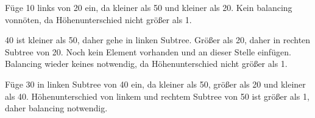 \documentclass[a4paper, 12pt, margins=2.5cm]{homework}
\begin{document}
\begin{solution}
\begin{enumerate}[label=(\alph*)]
        \begin{center}
        \end{center}
        Füge 10 links von 20 ein, da kleiner als 50 und kleiner als 20. Kein balancing
        vonnöten, da Höhenunterschied nicht größer als 1.

        \begin{center}
        \end{center}
        40 ist kleiner als 50, daher gehe in linken Subtree. Größer als 20, daher 
        in rechten Subtree von 20. Noch kein Element vorhanden und an dieser Stelle
        einfügen. Balancing wieder keines notwendig, da Höhenunterschied nicht
        größer als 1.

        \begin{center}
        \end{center}
        Füge 30 in linken Subtree von 40 ein, da kleiner als 50, größer als 20
        und kleiner als 40. Höhenunterschied von linkem und rechtem Subtree von 50
        ist größer als 1, daher balancing notwendig.


\end{enumerate}
\end{solution}
\end{document}
